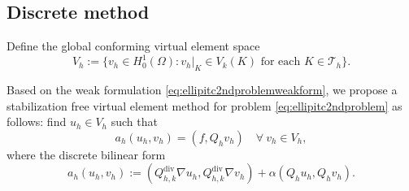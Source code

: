 \documentclass[10pt]{amsart}
\renewcommand{\div}{\operatorname{div}}
\numberwithin{equation}{section}
\begin{document}


\subsection{Discrete method}
Define the global conforming virtual element space
$$
V_h:=\{v_h\in H_0^1(\Omega): v_h|_K\in V_k(K) \textrm{ for each } K\in\mathcal T_h\}.
$$

Based on the weak formulation \eqref{eq:ellipitc2ndproblemweakform}, we propose a stabilization free virtual element method for problem \eqref{eq:ellipitc2ndproblem} as follows: find $u_h\in V_h$ such that
\begin{equation}\label{eq:cfmvem}
a_h(u_h, v_h)=(f, Q_hv_h)\quad\forall~v_h\in V_h,
\end{equation} 
where the discrete bilinear form 
$$
a_h(u_h, v_h):=(Q_{h,k}^{\div}\nabla u_h, Q_{h,k}^{\div}\nabla v_h)+\alpha(Q_hu_h, Q_hv_h).
$$
\end{document}

